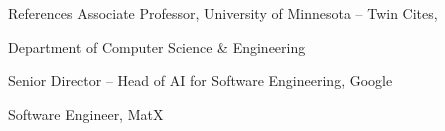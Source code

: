 
\prefix{}
\begin{rubric}{References}
    Associate Professor, University of Minnesota -- Twin Cites,\par
    Department of Computer Science \& Engineering\par 
\entry*[Bin Ni]
    Senior Director -- Head of AI for Software Engineering, Google\par 
    Software Engineer, MatX\par 

\end{rubric}
